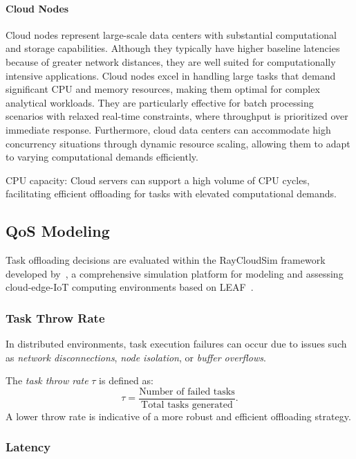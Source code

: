 \documentclass[preprint,3p,authoryear]{elsarticle}
\begin{document}
\paragraph{Cloud Nodes}\label{subsubsec:Cloud}
Cloud nodes represent large-scale data centers with substantial computational and storage capabilities. Although they typically have higher baseline latencies because of greater network distances, they are well suited for computationally intensive applications. Cloud nodes excel in handling large tasks that demand significant CPU and memory resources, making them optimal for complex analytical workloads. They are particularly effective for batch processing scenarios with relaxed real-time constraints, where throughput is prioritized over immediate response. Furthermore, cloud data centers can accommodate high concurrency situations through dynamic resource scaling, allowing them to adapt to varying computational demands efficiently.

CPU capacity: Cloud servers can support a high volume of CPU cycles, facilitating efficient offloading for tasks with elevated computational demands.

\subsection{QoS Modeling}\label{sec:qos_modeling}

Task offloading decisions are evaluated within the RayCloudSim framework developed by~\cite{zhang2022osttd}, a comprehensive simulation platform for modeling and assessing cloud-edge-IoT computing environments based on LEAF~\citep{WiesnerThamsen_LEAF_2021}.

\subsubsection{Task Throw Rate}\label{subsubsec:task_throw_rate}

In distributed environments, task execution failures can occur due to issues such as \emph{network disconnections}, \emph{node isolation}, or \emph{buffer overflows}.

The \emph{task throw rate} \(\tau\) is defined as:
\begin{equation}
\tau = \frac{\text{Number of failed tasks}}{\text{Total tasks generated}}.
\end{equation}
A lower throw rate is indicative of a more robust and efficient offloading strategy.

\subsubsection{Latency}\label{subsubsec:latency}
\end{document}
